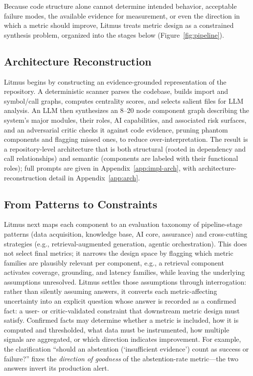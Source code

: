 \documentclass[11pt]{article}
\begin{document}
Because code structure alone cannot determine intended behavior, acceptable failure modes, the available evidence for measurement, or even the direction in which a metric should improve, Litmus treats metric design as a constrained synthesis problem, organized into the stages below (Figure~\ref{fig:pipeline}).

\subsection{Architecture Reconstruction}

Litmus begins by constructing an evidence-grounded representation of the repository. A deterministic scanner parses the codebase, builds import and symbol/call graphs, computes centrality scores, and selects salient files for LLM analysis. An LLM then synthesizes an 8--20 node component graph describing the system's major modules, their roles, AI capabilities, and associated risk surfaces, and an adversarial critic checks it against code evidence, pruning phantom components and flagging missed ones, to reduce over-interpretation. The result is a repository-level architecture that is both structural (rooted in dependency and call relationships) and semantic (components are labeled with their functional roles); full prompts are given in Appendix~\ref{app:impl-arch}, with architecture-reconstruction detail in Appendix~\ref{app:arch}.

\subsection{From Patterns to Constraints}

Litmus next maps each component to an evaluation taxonomy of pipeline-stage patterns (data acquisition, knowledge base, AI core, assurance) and cross-cutting strategies (e.g., retrieval-augmented generation, agentic orchestration). This does not select final metrics; it narrows the design space by flagging which metric families are plausibly relevant per component, e.g., a retrieval component activates coverage, grounding, and latency families, while leaving the underlying assumptions unresolved. Litmus settles those assumptions through interrogation: rather than silently assuming answers, it converts each metric-affecting uncertainty into an explicit question whose answer is recorded as a confirmed fact: a user- or critic-validated constraint that downstream metric design must satisfy. Confirmed facts may determine whether a metric is included, how it is computed and thresholded, what data must be instrumented, how multiple signals are aggregated, or which direction indicates improvement. For example, the clarification ``should an abstention (`insufficient evidence') count as success or failure?'' fixes the \emph{direction of goodness} of the abstention-rate metric---the two answers invert its production alert.
\end{document}
